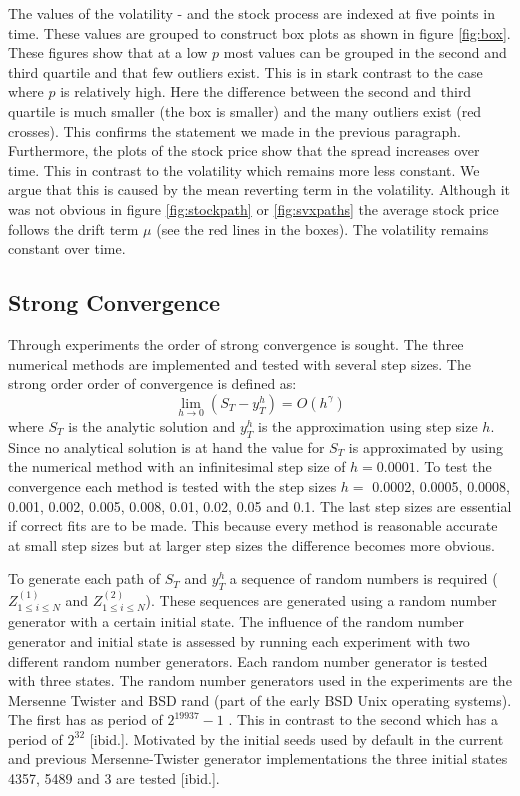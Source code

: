 \documentclass[a4paper,onecolumn]{IEEEtran}
\begin{document}
The values of the volatility - and the stock process are indexed at five
points in time. These values are grouped to construct box plots as shown in
figure \ref{fig:box}. These figures show that at a low $p$ most values can be
grouped in the second and third quartile and that few outliers exist. This is
in stark contrast to the case where $p$ is relatively high. Here the
difference between the second and third quartile is much smaller (the box is
smaller) and the many outliers exist (red crosses). This confirms the
statement we made in the previous paragraph. Furthermore, the plots of the
stock price show that the spread increases over time. This in contrast to the
volatility which remains more less constant. We argue that this is caused by
the mean reverting term in the volatility. Although it was not obvious in figure
\ref{fig:stockpath} or \ref{fig:svxpaths} the average stock price follows the
drift term $\mu$ (see the red lines in the boxes). The volatility remains
constant over time.


\subsection{Strong Convergence}
Through experiments the order of strong convergence is sought. The three
numerical methods are implemented and tested with several step sizes. The
strong order order of convergence is defined as:
\begin{equation}\label{eq:strng}
\lim_{h\rightarrow 0}(S_T - y_T^h) = O(h^\gamma)
\end{equation}
where $S_T$ is the analytic solution and $y_T^h$ is the approximation using
step size $h$. Since no analytical solution is at hand the value for $S_T$ is
approximated by using the numerical method with an infinitesimal step size of
$h = 0.0001$. To test the convergence each method is tested with the step
sizes  $h =$ 0.0002, 0.0005, 0.0008, 0.001, 0.002, 0.005, 0.008, 0.01, 0.02,
0.05 and 0.1. The last step sizes are essential if correct fits are to be
made. This because every method is reasonable accurate at small step sizes but
at larger step sizes the difference becomes more obvious.

To generate each path of $S_T$ and $y_T^h$ a sequence of random numbers is
required ($Z^{(1)}_{1\leq i \leq N}$ and $Z^{(2)}_{1\leq i \leq N}$). These
sequences are generated using a random number generator with a certain initial
state.  The influence of the random number generator and initial state is
assessed by running each experiment with two different random number
generators. Each random number generator is tested with three states. The
random number generators used in the experiments are the Mersenne Twister
\cite{matsumoto1998mtd} and BSD rand (part of the early BSD Unix operating
systems). The first has as period of $2^{19937} - 1$ \cite{Galassi:2006:GSL}.
This in contrast to the second which has a period of $2^{32}$ [ibid.].
Motivated by the initial seeds used by default in the current and previous
Mersenne-Twister generator implementations the three initial states 4357, 5489
and 3 are tested [ibid.].
\end{document}
